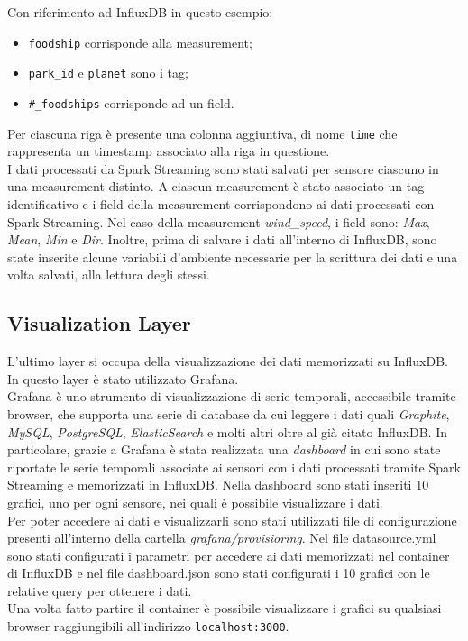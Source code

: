 \documentclass{article}
\begin{document}
\smallskip
\noindent
Con riferimento ad InfluxDB in questo esempio:
\begin{itemize}[noitemsep]
    \item \texttt{foodship} corrisponde alla measurement;
    \item \texttt{park\_id} e \texttt{planet} sono i tag;
    \item \texttt{\#\_foodships} corrisponde ad un field.
\end{itemize}

\noindent
Per ciascuna riga è presente una colonna aggiuntiva, di nome \texttt{time} che rappresenta un timestamp associato alla riga in questione.\\

\noindent
I dati processati da Spark Streaming sono stati salvati per sensore ciascuno in una measurement distinto. A ciascun measurement è stato associato un tag identificativo e i field della measurement corrispondono ai dati processati con Spark Streaming. Nel caso della measurement \textit{wind\_speed}, i field sono: \textit{Max}, \textit{Mean}, \textit{Min} e \textit{Dir}. 
Inoltre, prima di salvare i dati all'interno di InfluxDB, sono state inserite alcune variabili d'ambiente necessarie per la scrittura dei dati e una volta salvati, alla lettura degli stessi.



\subsection{Visualization Layer}
L'ultimo layer si occupa della visualizzazione dei dati memorizzati su InfluxDB. In questo layer è stato utilizzato Grafana.\\ 
Grafana è uno strumento di visualizzazione di serie temporali, accessibile tramite browser, che supporta una serie di database da cui leggere i dati quali \textit{Graphite}, \textit{MySQL}, \textit{PostgreSQL}, \textit{ElasticSearch} e molti altri oltre al già citato InfluxDB.
In particolare, grazie a Grafana è stata realizzata una \textit{dashboard} in cui sono state riportate le serie temporali associate ai sensori con i dati processati tramite Spark Streaming e memorizzati in InfluxDB. Nella dashboard sono stati inseriti 10 grafici, uno per ogni sensore, nei quali è possibile visualizzare i dati.\\
Per poter accedere ai dati e visualizzarli sono stati utilizzati file di configurazione presenti all'interno della cartella \textit{grafana/provisioring}. Nel file datasource.yml sono stati configurati i parametri per accedere ai dati memorizzati nel container di InfluxDB e nel file dashboard.json sono stati configurati i 10 grafici con le relative query per ottenere i dati.\\
Una volta fatto partire il container è possibile visualizzare i grafici su qualsiasi browser raggiungibili all'indirizzo \texttt{localhost:3000}.
\end{document}
